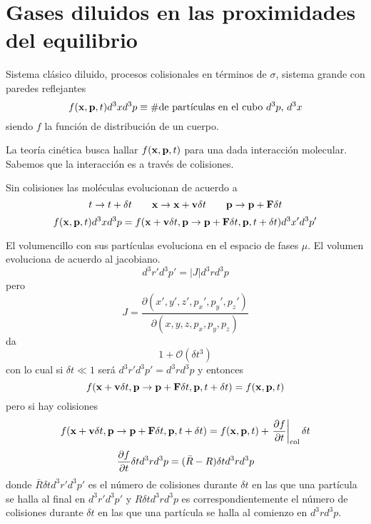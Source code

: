 \documentclass[10pt,oneside]{CBFT_book}
\begin{document}
\chapter{Gases diluidos en las proximidades del equilibrio}



Sistema clásico diluido, procesos colisionales en términos de $\sigma$, sistema grande con paredes
reflejantes
\[
	f(\vb{x}, \vb{p}, t) d^3 x d^3 p \equiv \# \text{de partículas en el cubo $d^3 p$, $d^3x$}
\]
siendo $f$ la función de distribución de un cuerpo.

La teoría cinética busca hallar $f(\vb{x}, \vb{p}, t)$ para una dada interacción molecular.
Sabemos que la interacción es a través de colisiones.

Sin colisiones las moléculas evolucionan de acuerdo a
\[
	t \to t + \delta t \qquad \vb{x} \to \vb{x} + \vb{v}\delta t \qquad 
	\vb{p} \to \vb{p} + \vb{F}\delta t 
\]
\[
	f(\vb{x}, \vb{p}, t) d^3 x d^3 p = 
	f(\vb{x} + \vb{v}\delta t , \vb{p} \to \vb{p} + \vb{F}\delta t , \vb{p}, t + \delta t) d^3 x' d^3 p'
\]

El volumencillo con sus partículas evoluciona en el espacio de fases $\mu$.
El volumen evoluciona de acuerdo al jacobiano.
\[
	d^3r' d^3p' = |J| d^3r d^3p
\]
pero 
\[
	J = \frac{\partial(x',y',z',p_x',p_y',p_z')}{\partial(x,y,z,p_x,p_y,p_z)}
\]
da 
\[
	1 + \mathcal{O}(\delta t^3)
\]
con lo cual si $ \delta t \ll 1$ será $d^3r' d^3p' = d^3r d^3p$ y entonces
\[
	f(\vb{x} + \vb{v}\delta t , \vb{p} \to \vb{p} + \vb{F}\delta t , \vb{p}, t + \delta t) = 
		f(\vb{x}, \vb{p}, t)
\]
pero si hay colisiones
\[
	f(\vb{x} + \vb{v}\delta t , \vb{p} \to \vb{p} + \vb{F}\delta t , \vb{p}, t + \delta t) = 
		f(\vb{x}, \vb{p}, t)	+ \left. \dpar{f}{t} \right|_{ \text{col}} \delta t
\]
\[
	\frac{\partial^{\hspace{-0.05em}} {f}}{\partial {t}^{\hspace{-0.05em}}}  \delta t d^3r d^3p = (\bar{R}- R) \delta t d^3r d^3p
\]
donde $\bar{R} \delta t d^3r' d^3p'$ es el número de colisiones durante $\delta t$ en las que una
partícula se halla al final en $d^3r' d^3p'$ y $R \delta t d^3r d^3p$ es correspondientemente el
número de colisiones durante $\delta t$ en las que una partícula se halla al comienzo en $d^3r d^3p$.
\end{document}
